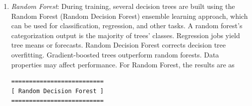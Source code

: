 \documentclass[sn-basic]{sn-jnl}%
\theoremstyle{thmstyleone}%
\theoremstyle{thmstyletwo}%
\theoremstyle{thmstylethree}%
\begin{document}
\begin{enumerate}
\begin{figure}[!h]
{or attributes are absent) is 110, and True Negative (An accurate test result that shows the absence of a condition or trait) is 22.}
\label{Fig. 3}
\end{figure}
\item \textit{Random Forest}: During training, several decision trees are built using the Random Forest (Random Decision Forest) ensemble learning approach, which can be used for classification, regression, and other tasks. A random forest's categorization output is the majority of trees' classes. Regression jobs yield tree means or forecasts. Random Decision Forest corrects decision tree overfitting. Gradient-boosted trees outperform random forests. Data properties may affect performance. For Random Forest, the results are as
\begin{verbatim}
==========================
[ Random Decision Forest ]
==========================


\end{verbatim}
\end{enumerate}
\end{document}
